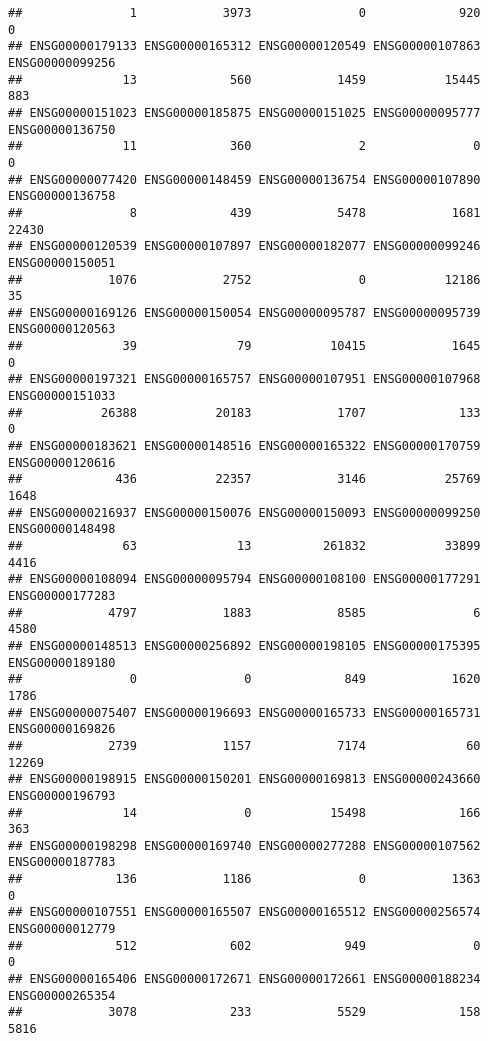 \documentclass[
]{article}
\begin{document}
\begin{verbatim}
##               1            3973               0             920               0 
## ENSG00000179133 ENSG00000165312 ENSG00000120549 ENSG00000107863 ENSG00000099256 
##              13             560            1459           15445             883 
## ENSG00000151023 ENSG00000185875 ENSG00000151025 ENSG00000095777 ENSG00000136750 
##              11             360               2               0               0 
## ENSG00000077420 ENSG00000148459 ENSG00000136754 ENSG00000107890 ENSG00000136758 
##               8             439            5478            1681           22430 
## ENSG00000120539 ENSG00000107897 ENSG00000182077 ENSG00000099246 ENSG00000150051 
##            1076            2752               0           12186              35 
## ENSG00000169126 ENSG00000150054 ENSG00000095787 ENSG00000095739 ENSG00000120563 
##              39              79           10415            1645               0 
## ENSG00000197321 ENSG00000165757 ENSG00000107951 ENSG00000107968 ENSG00000151033 
##           26388           20183            1707             133               0 
## ENSG00000183621 ENSG00000148516 ENSG00000165322 ENSG00000170759 ENSG00000120616 
##             436           22357            3146           25769            1648 
## ENSG00000216937 ENSG00000150076 ENSG00000150093 ENSG00000099250 ENSG00000148498 
##              63              13          261832           33899            4416 
## ENSG00000108094 ENSG00000095794 ENSG00000108100 ENSG00000177291 ENSG00000177283 
##            4797            1883            8585               6            4580 
## ENSG00000148513 ENSG00000256892 ENSG00000198105 ENSG00000175395 ENSG00000189180 
##               0               0             849            1620            1786 
## ENSG00000075407 ENSG00000196693 ENSG00000165733 ENSG00000165731 ENSG00000169826 
##            2739            1157            7174              60           12269 
## ENSG00000198915 ENSG00000150201 ENSG00000169813 ENSG00000243660 ENSG00000196793 
##              14               0           15498             166             363 
## ENSG00000198298 ENSG00000169740 ENSG00000277288 ENSG00000107562 ENSG00000187783 
##             136            1186               0            1363               0 
## ENSG00000107551 ENSG00000165507 ENSG00000165512 ENSG00000256574 ENSG00000012779 
##             512             602             949               0               0 
## ENSG00000165406 ENSG00000172671 ENSG00000172661 ENSG00000188234 ENSG00000265354 
##            3078             233            5529             158            5816 

\end{verbatim}
\end{document}
